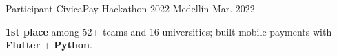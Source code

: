 
\begin{cventries}
  \cventry
  {Participant}
  {CivicaPay Hackathon 2022}
  {Medellín}
  {Mar. 2022}
  {
    \begin{cvitems}
      \item {\textbf{1st place} among 52+ teams and 16 universities; built mobile payments with \textbf{Flutter} + \textbf{Python}.}
    \end{cvitems}
  }
\end{cventries}
